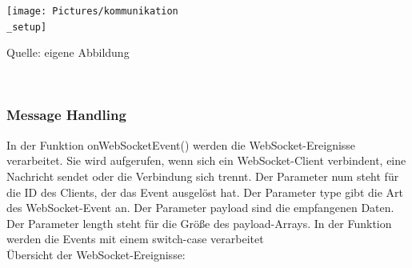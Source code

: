 \documentclass[ngerman,12pt,a4paper]{article}
\begin{document}
	\begin{center}
		\begin{minipage}[t]{0.55\textwidth}
			\texttt{[image: Pictures/kommunikation\\\_setup]}
			\label{fig:kommunikation_setup}
			\vspace{-10pt}
			\begin{center}
				\par\small Quelle: eigene Abbildung 
			\end{center}
		\end{minipage} \\[0.75cm]
	\end{center}	
	
			\subsubsection{Message Handling}
			
	In der Funktion onWebSocketEvent() werden die WebSocket-Ereignisse verarbeitet. Sie wird aufgerufen, wenn sich ein WebSocket-Client verbindent, eine Nachricht sendet oder die Verbindung sich trennt.
	Der Parameter num steht für die ID des Clients, der das Event ausgelöst hat. Der Parameter type gibt die Art des WebSocket-Event an. Der Parameter payload sind die empfangenen Daten. Der Parameter length steht für die Größe des payload-Arrays. 
	In der Funktion werden die Events mit einem switch-case verarbeitet\\[0.5cm]
	Übersicht der WebSocket-Ereignisse:
	
\end{document}
